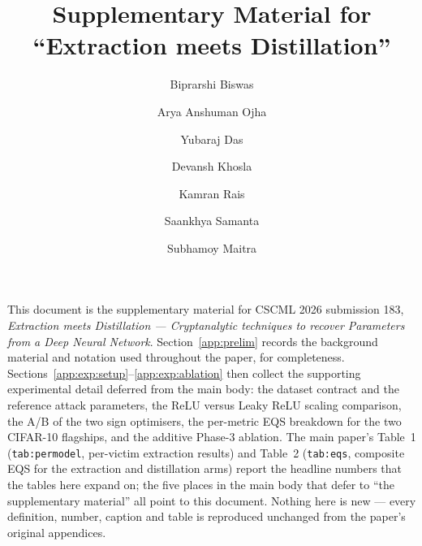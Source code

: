 \documentclass[runningheads,orivec]{llncs}
\begin{document}
\title{Supplementary Material for ``Extraction meets Distillation''}
\author{
    Biprarshi Biswas \and
    Arya Anshuman Ojha \and
    Yubaraj Das \and
    Devansh Khosla \and
    Kamran Rais \and
    Saankhya Samanta \and
    Subhamoy Maitra
}

\maketitle

\noindent
This document is the supplementary material for CSCML 2026 submission 183,
\emph{Extraction meets Distillation --- Cryptanalytic techniques to recover
Parameters from a Deep Neural Network}. Section~\ref{app:prelim} records the
background material and notation used throughout the paper, for completeness.
Sections~\ref{app:exp:setup}--\ref{app:exp:ablation} then collect the supporting
experimental detail deferred from the main body: the dataset contract and the
reference attack parameters, the ReLU versus Leaky ReLU scaling comparison, the
A/B of the two sign optimisers, the per-metric EQS breakdown for the two
CIFAR-10 flagships, and the additive Phase-3 ablation. The main paper's
Table~1 (\texttt{tab:permodel}, per-victim extraction results) and Table~2
(\texttt{tab:eqs}, composite EQS for the extraction and distillation arms)
report the headline numbers that the tables here expand on; the five places in
the main body that defer to ``the supplementary material'' all point to this
document. Nothing here is new --- every definition, number, caption and table is
reproduced unchanged from the paper's original appendices.
\end{document}
